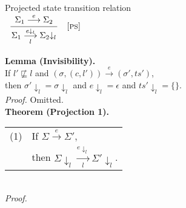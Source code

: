 \documentclass{article}
\makeatletter
\newcommand{\startrules}{\begin{array}{l@{~{,}~}lcl@{~{,}~}l|ll}}
\newcommand{\finishrules}{\end{array}}
\newcommand{\rn}[1]{\text{\textsc{[#1]}}}
\newcommand{\mrule}[3]{%
      \multicolumn{6}{c}{
        \dfrac{
          \begin{array}{c}
            #2
          \end{array}
        }{#3}
      }
    &
      \rn{#1}
  \\
      \multicolumn{7}{c}{}
  \\%
}
\newcommand{\tsteparrow}[1]{\overset{#1}{\longrightarrow}}
\newcommand{\tstep}[3]{#2\tsteparrow{#1}#3}
\newcommand{\ssteparrow}[1]{\overset{#1}{\longrightarrow}}
\newcommand{\sstep}[3]{#2\ssteparrow{#1}#3}
\newcommand{\lssteparrow}[2]{\overset{#2}{\underset{#1}{\longrightarrow}}}
\newcommand{\lsstep}[4]{#3\lssteparrow{#1}{#2}#4}
\newcommand{\thread}[2]{(#1,#2)}
\newcommand{\proj}[2]{#1{\downarrow_{#2}}}
\makeatother
\begin{document}
\newpage
\noindent
%
%
\fbox{$\lsstep{l}{e}{\Sigma}{\Sigma}$} Projected state transition relation
\\
$\startrules
  \mrule{ps}{
      \sstep{e}{\Sigma_1}{\Sigma_2}
  }{
    \lsstep{l}{\proj{e}{l}}{\Sigma_1}{\proj{\Sigma_2}{l}}
  }
\finishrules$
\\
\textbf{Lemma (Invisibility).}
\\
If $l'\not\sqsubseteq l$
and $\tstep{e}{(\sigma,\thread{c}{l'})}{(\sigma',ts')}$,
\\
then $\proj{\sigma'}{l}=\proj{\sigma}{l}$
and $\proj{e}{l}=\epsilon$
and $\proj{ts'}{l}=\{\}$.
\\
\textit{Proof.}
Omitted.
\\
\textbf{Theorem (Projection 1).}
\\
\begin{tabular}{l@{$\qquad$}l}
  (1) & If $\sstep{e}{\Sigma}{\Sigma'}$,
\\
      & then $\lsstep{l}{\proj{e}{l}}{\proj{\Sigma}{l}}{\proj{\Sigma'}{l}}$.
\end{tabular}
\\
\textit{Proof.}
\\
\newcommand{\z}{$\quad$}
\end{document}
